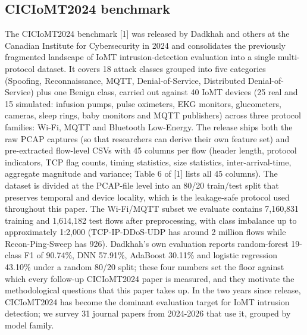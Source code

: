 \documentclass[11pt]{article}
\begin{document}
\subsection{CICIoMT2024 benchmark}
The CICIoMT2024 benchmark [1] was released by Dadkhah and others at the Canadian Institute for Cybersecurity in 2024 and consolidates the previously fragmented landscape of IoMT intrusion-detection evaluation into a single multi-protocol dataset. It covers 18 attack classes grouped into five categories (Spoofing, Reconnaissance, MQTT, Denial-of-Service, Distributed Denial-of-Service) plus one Benign class, carried out against 40 IoMT devices (25 real and 15 simulated: infusion pumps, pulse oximeters, EKG monitors, glucometers, cameras, sleep rings, baby monitors and MQTT publishers) across three protocol families: Wi-Fi, MQTT and Bluetooth Low-Energy. The release ships both the raw PCAP captures (so that researchers can derive their own feature set) and pre-extracted flow-level CSVs with 45 columns per flow (header length, protocol indicators, TCP flag counts, timing statistics, size statistics, inter-arrival-time, aggregate magnitude and variance; Table 6 of [1] lists all 45 columns). The dataset is divided at the PCAP-file level into an 80/20 train/test split that preserves temporal and device locality, which is the leakage-safe protocol used throughout this paper. The Wi-Fi/MQTT subset we evaluate contains 7,160,831 training and 1,614,182 test flows after preprocessing, with class imbalance up to approximately 1:2,000 (TCP-IP-DDoS-UDP has around 2 million flows while Recon-Ping-Sweep has 926). Dadkhah's own evaluation reports random-forest 19-class F1 of 90.74\%, DNN 57.91\%, AdaBoost 30.11\% and logistic regression 43.10\% under a random 80/20 split; these four numbers set the floor against which every follow-up CICIoMT2024 paper is measured, and they motivate the methodological questions that this paper takes up. In the two years since release, CICIoMT2024 has become the dominant evaluation target for IoMT intrusion detection; we survey 31 journal papers from 2024-2026 that use it, grouped by model family.
\end{document}
